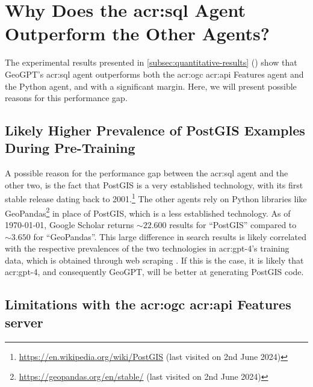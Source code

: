 

\section[Why Does the SQL Agent Outperform the Other Agents?]{Why Does the \acrshort{acr:sql} Agent Outperform the Other Agents?}
\label{sec:why-sql-better}

The experimental results presented in \autoref{subsec:quantitative-results} () show that GeoGPT's \acrshort{acr:sql} agent outperforms both the \acrshort{acr:ogc} \acrshort{acr:api} Features agent and the Python agent, and with a significant margin. Here, we will present possible reasons for this performance gap.

\subsection{Likely Higher Prevalence of PostGIS Examples During Pre-Training}

A possible reason for the performance gap between the \acrshort{acr:sql} agent and the other two, is the fact that PostGIS is a very established technology, with its first stable release dating back to 2001.\footnote{\url{https://en.wikipedia.org/wiki/PostGIS} (last visited on 2nd June 2024)} The other agents rely on Python libraries like GeoPandas\footnote{\url{https://geopandas.org/en/stable/} (last visited on 2nd June 2024)} in place of PostGIS, which is a less established technology. As of \today, Google Scholar returns $\sim 22.600$ results for \enquote{PostGIS} compared to  $\sim 3.650$ for \enquote{GeoPandas}. This large difference in search results is likely correlated with the respective prevalences of the two technologies in \acrshort{acr:gpt}-4's training data, which is obtained through web scraping \citep[3]{radfordLanguageModelsAre2019}. If this is the case, it is likely that \acrshort{acr:gpt}-4, and consequently GeoGPT, will be better at generating PostGIS code.

\subsection[Limitations with the OGC API Features server]{Limitations with the \acrshort{acr:ogc} \acrshort{acr:api} Features server}
\label{subsec:difficulties-with-oaf}

